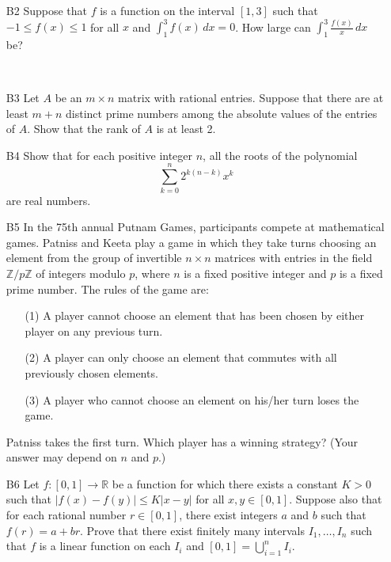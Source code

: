 \documentclass[amssymb,twocolumn,pra,10pt,aps]{revtex4-1}
\begin{document}
\begin{itemize}
\item[B2]
Suppose that $f$ is a function on the interval $[1,3]$ such that $-1 \leq f(x) \leq 1$ for all $x$ and $\int_1^3 f(x)\,dx = 0$. How large can $\int_1^3 \frac{f(x)}{x}\,dx$ be?

\,

\item[B3]
Let $A$ be an $m \times n$ matrix with rational entries.
Suppose that there are at least $m+n$ distinct prime numbers among the absolute values of the entries of $A$. Show that the rank of $A$ is at least 2.

\item[B4]
Show that for each positive integer $n$, all the roots of the polynomial
\[
\sum_{k=0}^n 2^{k(n-k)} x^k
\]
are real numbers.

\item[B5]
In the 75th annual Putnam Games, participants compete at mathematical games.
Patniss and Keeta play a game in which they take turns choosing an element 
from the group of invertible $n \times n$ matrices with entries in the field
$\mathbb{Z}/p \mathbb{Z}$ of integers modulo $p$, where $n$ is a fixed positive integer and $p$ is a fixed prime number. The rules of the game are:
\begin{enumerate}
\item[(1)]
A player cannot choose an element that has been chosen by either player on any previous turn.
\item[(2)]
A player can only choose an element that commutes with all previously chosen elements.
\item[(3)]
A player who cannot choose an element on his/her turn loses the game.
\end{enumerate}
Patniss takes the first turn. Which player has a winning strategy?
(Your answer may depend on $n$ and $p$.)

\item[B6]
Let $f: [0,1] \to \mathbb{R}$ be a function for which there exists a constant $K>0$
such that $\left| f(x) - f(y) \right| \leq K \left| x - y \right|$ for all $x,y \in [0,1]$.
Suppose also that for each rational number $r \in [0,1]$, there exist integers $a$ and $b$
such that $f(r) = a + br$. Prove that there exist finitely many intervals $I_1, \dots, I_n$
such that $f$ is a linear function on each $I_i$ and $[0,1] = \bigcup_{i=1}^n I_i$. 

\end{itemize}
\end{document}
